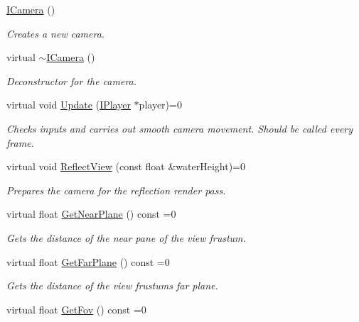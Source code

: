 \begin{DoxyCompactItemize}
\item 
\hyperlink{class_flounder_1_1_i_camera_a7ff574ca957560727283922bb4af1156}{I\+Camera} ()
\begin{DoxyCompactList}\small\item\em Creates a new camera. \end{DoxyCompactList}\item 
virtual \hyperlink{class_flounder_1_1_i_camera_a812ffcf7d09cb3ea85e8128bcc95e01a}{$\sim$\+I\+Camera} ()
\begin{DoxyCompactList}\small\item\em Deconstructor for the camera. \end{DoxyCompactList}\item 
virtual void \hyperlink{class_flounder_1_1_i_camera_a1da52b32a354f2ed2c50302f84fba806}{Update} (\hyperlink{class_flounder_1_1_i_player}{I\+Player} $\ast$player)=0
\begin{DoxyCompactList}\small\item\em Checks inputs and carries out smooth camera movement. Should be called every frame. \end{DoxyCompactList}\item 
virtual void \hyperlink{class_flounder_1_1_i_camera_a2f7a658a55a2445aa8b519b441e4fb5f}{Reflect\+View} (const float \&water\+Height)=0
\begin{DoxyCompactList}\small\item\em Prepares the camera for the reflection render pass. \end{DoxyCompactList}\item 
virtual float \hyperlink{class_flounder_1_1_i_camera_ac8790126026e7c4cd6e285627d2c5ba8}{Get\+Near\+Plane} () const =0
\begin{DoxyCompactList}\small\item\em Gets the distance of the near pane of the view frustum. \end{DoxyCompactList}\item 
virtual float \hyperlink{class_flounder_1_1_i_camera_ad21b097da1c612a48ea6f98f31ed93cf}{Get\+Far\+Plane} () const =0
\begin{DoxyCompactList}\small\item\em Gets the distance of the view frustum\textquotesingle{}s far plane. \end{DoxyCompactList}\item 
virtual float \hyperlink{class_flounder_1_1_i_camera_ae3e6d8f9745ee494b15b3901fba9dd88}{Get\+Fov} () const =0

\end{DoxyCompactItemize}
